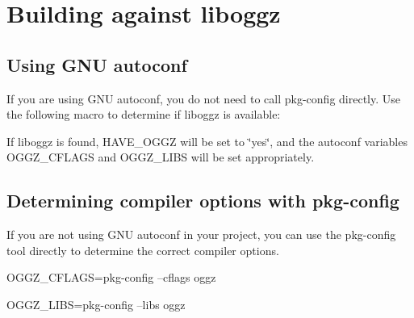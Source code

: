 \section{Building against liboggz}
\label{group__building}
\subsection{Using G\-N\-U autoconf}\label{group__building_autoconf}
If you are using G\-N\-U autoconf, you do not need to call pkg-\/config directly. Use the following macro to determine if liboggz is available\-:




If liboggz is found, H\-A\-V\-E\-\_\-\-O\-G\-G\-Z will be set to \char`\"{}yes\char`\"{}, and the autoconf variables O\-G\-G\-Z\-\_\-\-C\-F\-L\-A\-G\-S and O\-G\-G\-Z\-\_\-\-L\-I\-B\-S will be set appropriately.\subsection{Determining compiler options with pkg-\/config}\label{group__building_pkg-config}
If you are not using G\-N\-U autoconf in your project, you can use the pkg-\/config tool directly to determine the correct compiler options.


\begin{DoxyPre}
OGGZ\_CFLAGS={\ttfamily pkg-config --cflags oggz}\end{DoxyPre}



\begin{DoxyPre}OGGZ\_LIBS={\ttfamily pkg-config --libs oggz}
\end{DoxyPre}
 